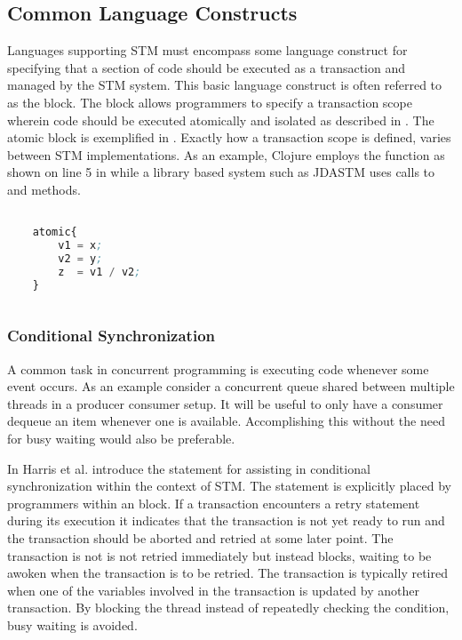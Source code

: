 \subsection{Common Language Constructs}
\label{sec:stm_common_constructs}
Languages supporting \ac{STM} must encompass some language construct for specifying that a section of code should be executed as a transaction and managed by the \ac{STM} system. This basic language construct is often referred to as the  block\cite[p. 49]{harris2005composable}\cite[p. 3]{harris2003language}. The  block allows programmers to specify a transaction scope wherein code should be executed atomically and isolated as described in . The atomic block is exemplified in . Exactly how a transaction scope is defined, varies between \ac{STM} implementations. As an example, Clojure employs the  function as shown on line 5 in  while a library based system such as JDASTM\cite{ramadan2009committing} uses calls to  and  methods.

\begin{lstlisting}[label=lst:stm_atomic_block,
  caption={The atomic block},
  language=Lisp,  
  showspaces=false,
  showtabs=false,
  breaklines=true,
  showstringspaces=false,
  breakatwhitespace=true,
  commentstyle=\color{greencomments},
  keywordstyle=\color{bluekeywords},
  stringstyle=\color{redstrings},
  morekeywords={atomic}]  % Start your code-block

	atomic{
		v1 = x;
		v2 = y;
		z  = v1 / v2;	
	}
       
\end{lstlisting}

\subsubsection{Conditional Synchronization}
A common task in concurrent programming is executing code whenever some event occurs. As an example consider a concurrent queue shared between multiple threads in a producer consumer setup. It will be useful to only have a consumer dequeue an item whenever one is available. Accomplishing this without the need for busy waiting would also be preferable.

In \cite{harris2005composable} Harris et al. introduce the  statement for assisting in conditional synchronization within the context of \ac{STM}. The  statement is explicitly placed by programmers within an  block. If a transaction encounters a retry statement during its execution it indicates that the transaction is not yet ready to run and the transaction should be aborted and retried at some later point\cite[p. 73]{harris2010transactional}. The transaction is not is not retried immediately but instead blocks, waiting to be awoken when the transaction is to be retried. The transaction is typically retired when one of the variables involved in the transaction is updated by another transaction\cite[p. 51]{harris2005composable}. By blocking the thread instead of repeatedly checking the condition, busy waiting is avoided.

